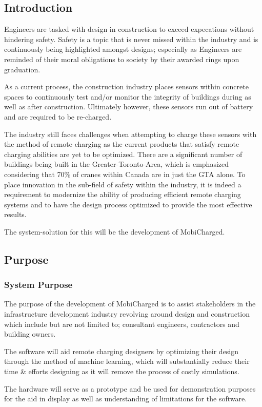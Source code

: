 \documentclass[12pt, titlepage]{article}
\begin{document}
\subsection{Introduction}

Engineers are tasked with design in construction to exceed expecations without hindering safety. Safety is a topic that is never missed within the industry and is continuously being highlighted amongst designs; especially as Engineers are reminded of their moral obligations to society by their awarded rings upon graduation. 
\par
As a current process, the construction industry places sensors within concrete spaces to continuously test and/or monitor the integrity of buildings during as well as after construction. Ultimately however, these sensors run out of battery and are required to be re-charged.
\par
The industry still faces challenges when attempting to charge these sensors with the method of remote charging as the current products that satisfy remote charging abilities are yet to be optimized. There are a significant number of buildings being built in the Greater-Toronto-Area, which is emphasized considering that 70\% of cranes within Canada are in just the GTA alone. To place innovation in the sub-field of safety within the industry, it is indeed a requirement to modernize the ability of producing efficient remote charging systems and to have the design process optimized to provide the most effective results.
\par
The system-solution for this will be the development of MobiCharged. 


\subsection{Purpose}

\subsubsection{System Purpose}
\par
The purpose of the development of MobiCharged is to assist stakeholders in the infrastructure development industry revolving around design and construction which include but are not limited to; consultant engineers, contractors and building owners. 
\par
The software will aid remote charging designers by optimizing their design through the method of machine learning, which will substantially reduce their time \& efforts designing as it will remove the process of costly simulations. 
\par
The hardware will serve as a prototype and be used for demonstration purposes for the aid in display as well as understanding of limitations for the software. 
\end{document}

